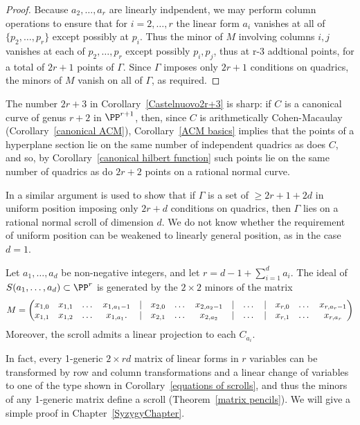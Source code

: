 \begin{proof}
Because $a_2,\dots, a_r$ are linearly indpendent,
we may perform column operations to ensure that for $i=2, \dots, r$ the linear form
$a_i$ vanishes at all of $\{p_2,\dots, p_{r}\}$ except possibly at $p_i$.
Thus the minor of $M$ involving columns $i,j$ vanishes at each of $p_2,\dots, p_r$ except possibly
$p_i,p_j$, thus at r-3 addtional points, for a total of $2r+1$ points of $\Gamma$. Since
$\Gamma$ imposes only $2r+1$ conditions on quadrics, the minors of $M$ vanish on all of $\Gamma$,
as required. 
\end{proof}

 The number $2r+3$ in Corollary~\ref{Castelnuovo2r+3} is sharp: if $C$ is a canonical curve of genus $r+2$ in $\PP^{r+1}$, then, since $C$
 is arithmetically Cohen-Macaulay (Corollary~\ref{canonical ACM}), Corollary~\ref{ACM basics} implies that the points of a hyperplane 
 section lie on the same number of independent quadrics as does $C$, and so,
 by Corollary~\ref{canonical hilbert function} such points lie on the same number of
 quadrics as do $2r+2$ points on a rational normal curve.

\begin{fact}
In \cite{MR685427} a similar argument is used to show that if $\Gamma$ is a set of $\geq 2r+1+2d$ in uniform position
imposing only
$2r+d$ conditions on quadrics, then $\Gamma$ lies on a rational normal scroll of dimension $d$.
We do not know whether the requirement of uniform position can be weakened to linearly general position,
as in the case $d=1$.
\end{fact}
 
\begin{corollary}\label{equations of scrolls} Let $a_{1}, \dots, a_{d}$ be non-negative integers, and let 
$r = d-1+\sum_{i=1}^{d} a_{i}$.
The ideal of $S(a_{1},\dots,a_{d})\subset \PP^{r}$ is generated by the $2\times 2$ minors of the matrix
{\footnotesize
$$
\setcounter{MaxMatrixCols}{20}
M = \begin{pmatrix}
x_{1,0}&x_{1,1}&\dots&x_{1, a_{1}-1}&|&x_{2,0}&\dots&x_{2, a_{2}-1}&|&\dots&|&x_{r,0}&\dots&x_{r, a_{r}-1}\\
x_{1,1}&x_{1,2}&\dots&x_{1, a_{1}}.  &|&x_{2,1}&\dots&x_{2, a_{2}}&|&\dots&|&x_{r,1}&\dots&x_{r, a_{r}}
\end{pmatrix}
$$
}
Moreover, the scroll admits a linear projection to each $C_{a_i}$.
\end{corollary}

In fact, every
 1-generic $2 \times rd$ matrix of linear forms in $r$ variables can be transformed by row and column transformations and a linear change
 of variables to one of the type shown in
Corollary~\ref{equations of scrolls}, and thus the minors of any 1-generic matrix define a scroll (Theorem~\ref{matrix pencils}). We will give a simple proof
in Chapter~\ref{SyzygyChapter}.


